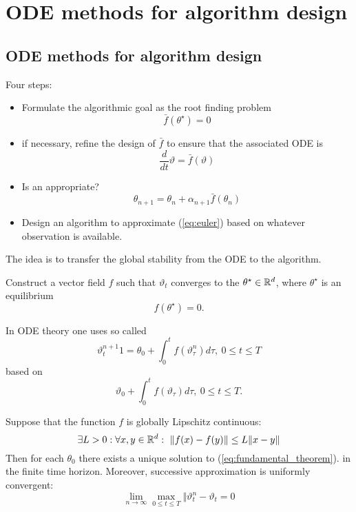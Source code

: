 \chapter{ODE methods for algorithm design}

\section{ODE methods for algorithm design} %

Four steps:
\begin{itemize}
    \item Formulate the algorithmic goal as the root finding problem 
        \[\bar{f}(\theta^\star)=0\]
    \item if necessary, refine the design of \(\bar{f}\) to ensure that 
          the associated ODE is  
          \[\frac{d}{dt}\vartheta=\bar{f}(\vartheta)\] 
    \item  Is an  appropriate? 
          \begin{equation}\label{eq:euler}\theta_{n+1}=\theta_n+\alpha_{n+1}\bar{f}(\theta_n)\end{equation}
    \item Design an algorithm to approximate (\ref{eq:euler}) based on whatever 
          observation is available.

\end{itemize}

\begin{remark}
    The idea is to transfer the global stability from the ODE to the algorithm.
\end{remark}

 Construct a vector field \(f\) such that \(\vartheta_t\)
converges to the  \(\theta^\star\in \mathbb{R}^d\), where 
\(\theta^\star\) is an equilibrium \[f(\theta^\star)=0.\]

In ODE theory one uses so called 
\begin{equation}\label{eq:picard-iterations}
    \vartheta_t^{n+1}1=\theta_0+\int_0^t f(\vartheta_\tau^n)d\tau,\ 0\leq t\leq T
\end{equation}
based on 
\begin{equation}\label{eq:fundamental_theorem}
    \vartheta_0+\int_0^t f(\vartheta_\tau)d\tau,\ 0 \leq t\leq T.
\end{equation}
\begin{proposition}\label{prop:25} %
    Suppose that the function \(f\) is globally Lipschitz continuous:
    \[\exists L >0: \forall x,y\in \mathbb{R}^d:\ \Vert f(x)-f(y)\Vert \leq L\Vert x -y \Vert\]    
    Then for each \(\theta_0\) there exists a unique solution to (\ref{eq:fundamental_theorem}).
    in the finite time horizon.
    Moreover, successive approximation is uniformly convergent:
    \[\lim_{n\to\infty}\max_{0\leq t\leq T}\Vert \vartheta_t^n-\vartheta_t=0\]
\end{proposition}

